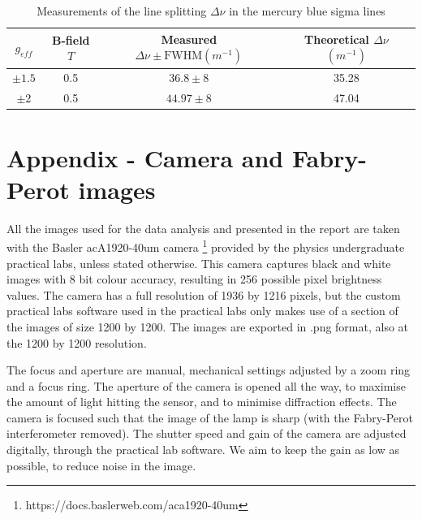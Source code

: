 \documentclass[11pt]{article}
\begin{document}
\begin{table}[h!]
    \centering
    \begin{tabular}{c|ccc}
    \toprule
         \( g_{eff} \) & B-field $\si{T}$ &  Measured $\Delta \nu \pm \mathrm{FWHM } (\si{m^{-1}})$ & Theoretical $\Delta \nu$ $(\si{m^{-1}})$\\
         \midrule
         $\pm 1.5$& 0.5 & $36.8 \pm 8$ & 35.28 \\
         $\pm 2$ & 0.5 & $44.97 \pm 8$ & 47.04 \\
    \end{tabular}
    \caption{Measurements of the line splitting $\Delta \nu$ in the mercury blue sigma lines}
    \label{tab: Hg blue sigma measurements}
\end{table}

\newpage
\section{Appendix - Camera and Fabry-Perot images}
All the images used for the data analysis and presented in the report are taken with the Basler acA1920-40um camera \footnote{https://docs.baslerweb.com/aca1920-40um} provided by the physics undergraduate practical labs, unless stated otherwise. This camera captures black and white images with 8 bit colour accuracy, resulting in 256 possible pixel brightness values. The camera has a full resolution of 1936 by 1216 pixels, but the custom practical labs software used in the practical labs only makes use of a section of the images of size 1200 by 1200. The images are exported in .png format, also at the 1200 by 1200 resolution. 

The focus and aperture are manual, mechanical settings adjusted by a zoom ring and a focus ring. The aperture of the camera is opened all the way, to maximise the amount of light hitting the sensor, and to minimise diffraction effects. The camera is focused such that the image of the lamp is sharp (with the Fabry-Perot interferometer removed). 
The shutter speed and gain of the camera are adjusted digitally, through the practical lab software. We aim to keep the gain as low as possible, to reduce noise in the image.  
\end{document}
